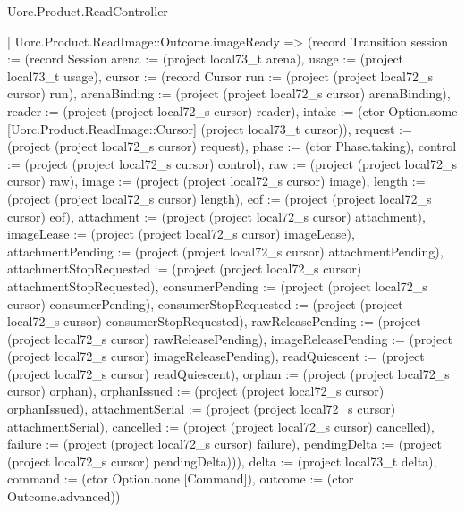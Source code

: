 \begin{lexlean}{Uorc.Product.ReadController}
\begin{semanticmodule}
{    | Uorc.Product.ReadImage::Outcome.imageReady => (record Transition {session := (record Session {arena := (project local73_t arena), usage := (project local73_t usage), cursor := (record Cursor {run := (project (project local72_s cursor) run), arenaBinding := (project (project local72_s cursor) arenaBinding), reader := (project (project local72_s cursor) reader), intake := (ctor Option.some [Uorc.Product.ReadImage::Cursor] (project local73_t cursor)), request := (project (project local72_s cursor) request), phase := (ctor Phase.taking), control := (project (project local72_s cursor) control), raw := (project (project local72_s cursor) raw), image := (project (project local72_s cursor) image), length := (project (project local72_s cursor) length), eof := (project (project local72_s cursor) eof), attachment := (project (project local72_s cursor) attachment), imageLease := (project (project local72_s cursor) imageLease), attachmentPending := (project (project local72_s cursor) attachmentPending), attachmentStopRequested := (project (project local72_s cursor) attachmentStopRequested), consumerPending := (project (project local72_s cursor) consumerPending), consumerStopRequested := (project (project local72_s cursor) consumerStopRequested), rawReleasePending := (project (project local72_s cursor) rawReleasePending), imageReleasePending := (project (project local72_s cursor) imageReleasePending), readQuiescent := (project (project local72_s cursor) readQuiescent), orphan := (project (project local72_s cursor) orphan), orphanIssued := (project (project local72_s cursor) orphanIssued), attachmentSerial := (project (project local72_s cursor) attachmentSerial), cancelled := (project (project local72_s cursor) cancelled), failure := (project (project local72_s cursor) failure), pendingDelta := (project (project local72_s cursor) pendingDelta)})}), delta := (project local73_t delta), command := (ctor Option.none [Command]), outcome := (ctor Outcome.advanced)})
}
\end{semanticmodule}
\end{lexlean}
